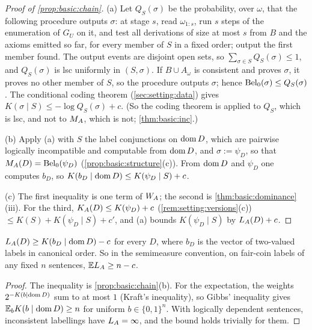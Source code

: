 \begin{proof}[Proof of \cref{prop:basic:chain}]
(a) Let $Q_S(\sigma)$ be the probability, over $\omega$, that the following procedure outputs $\sigma$: at stage $s$, read $\omega_{1:s}$, run $s$ steps of the enumeration of $G_U$ on it, and test all derivations of size at most $s$ from $B$ and the axioms emitted so far, for every member of $S$ in a fixed order; output the first member found. The output events are disjoint open sets, so $\sum_{\sigma\in S}Q_S(\sigma)\le1$, and $Q_S(\sigma)$ is lsc uniformly in $(S,\sigma)$. If $B\cup A_\omega$ is consistent and proves $\sigma$, it proves no other member of $S$, so the procedure outputs $\sigma$; hence $\mathrm{Bel}_0(\sigma)\le Q_S(\sigma)$. The conditional coding theorem (\cref{sec:setting:data}) gives $K(\sigma\mid S)\le-\log Q_S(\sigma)+c$. (So the coding theorem is applied to $Q_S$, which is lsc, and not to $M_{A}$, which is not; \cref{thm:basic:inc}.)

(b) Apply (a) with $S$ the label conjunctions on $\operatorname{dom} D$, which are pairwise logically incompatible and computable from $\operatorname{dom} D$, and $\sigma:=\psi_D$, so that $M_{A}(D)=\mathrm{Bel}_0(\psi_D)$ (\cref{prop:basic:structure}(c)). From $\operatorname{dom} D$ and $\psi_D$ one computes $b_D$, so $K(b_D\mid\operatorname{dom} D)\le K(\psi_D\mid S)+c$.

(c) The first inequality is one term of $W_{A}$; the second is \cref{thm:basic:dominance}(iii). For the third, $K_{A}(D)\le K(\psi_D)+c$ (\cref{rem:setting:versions}(c)) $\le K(S)+K(\psi_D\mid S)+c'$, and (a) bounds $K(\psi_D\mid S)$ by $L_{A}(D)+c$.
\end{proof}

\begin{proposition}\label{prop:basic:lower}
$L_{A}(D)\ge K(b_D\mid\operatorname{dom} D)-c$ for every $D$, where $b_D$ is the vector of two-valued labels in canonical order. So in the semimeasure convention, on fair-coin labels of any fixed $n$ sentences, $\mathbb{E}L_{A}\ge n-c$.
\end{proposition}

\begin{proof}
The inequality is \cref{prop:basic:chain}(b). For the expectation, the weights $2^{-K(b\mid\operatorname{dom} D)}$ sum to at most $1$ (Kraft's inequality), so Gibbs' inequality gives $\mathbb{E}_bK(b\mid\operatorname{dom} D)\ge n$ for uniform $b\in\{0,1\}^n$. With logically dependent sentences, inconsistent labellings have $L_{A}=\infty$, and the bound holds trivially for them.
\end{proof}


